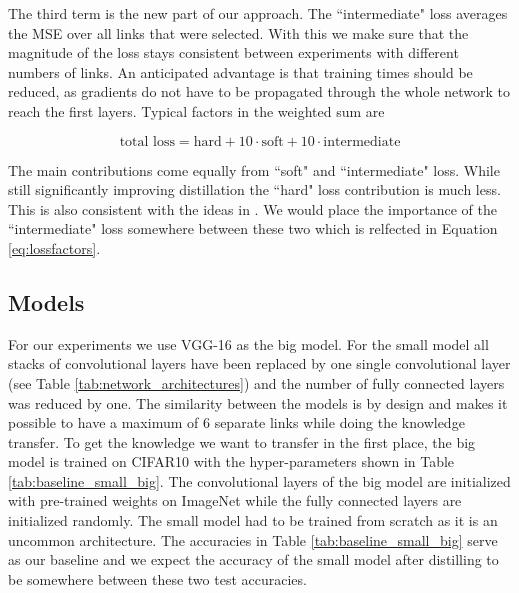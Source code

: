 \documentclass[10pt,twocolumn,letterpaper]{article}
\begin{document}
The third term is the new part of our approach. The ``intermediate" loss averages the MSE over all links that were selected. With this we make sure that the magnitude of the loss stays consistent between experiments with different numbers of links. An anticipated advantage is that training times should be reduced, as gradients do not have to be propagated through the whole network to reach the first layers. Typical factors in the weighted sum are

\begin{equation}
	\text{total loss} = \text{hard} + 10 \cdot \text{soft} + 10 \cdot \text{intermediate}
	\label{eq:totalloss}
\end{equation}

The main contributions come equally from ``soft"  and ``intermediate" loss. While still significantly improving distillation the ``hard" loss contribution is much less. This is also consistent with the ideas in \cite{hinton2015distilling}. We would place the importance of the ``intermediate" loss somewhere between these two which is relfected in Equation \ref{eq:lossfactors}.

\subsection{Models}

For our experiments we use VGG-16 \cite{DBLP:journals/corr/SimonyanZ14a} as the big model. For the small model all stacks of convolutional layers have been replaced by one single convolutional layer (see Table \ref{tab:network_architectures}) and the number of fully connected layers was reduced by one. The similarity between the models is by design and makes it possible to have a maximum of 6 separate links while doing the knowledge transfer. To get the knowledge we want to transfer in the first place, the big model is trained on CIFAR10 \cite{krizhevsky2009learning} with the hyper-parameters shown in Table \ref{tab:baseline_small_big}. The convolutional layers of the big model are initialized with pre-trained weights on ImageNet \cite{ILSVRC15} while the fully connected layers are initialized randomly. The small model had to be trained from scratch as it is an uncommon architecture. The accuracies in Table \ref{tab:baseline_small_big} serve as our baseline and we expect the accuracy of the small model after distilling to be somewhere between these two test accuracies.
\end{document}
